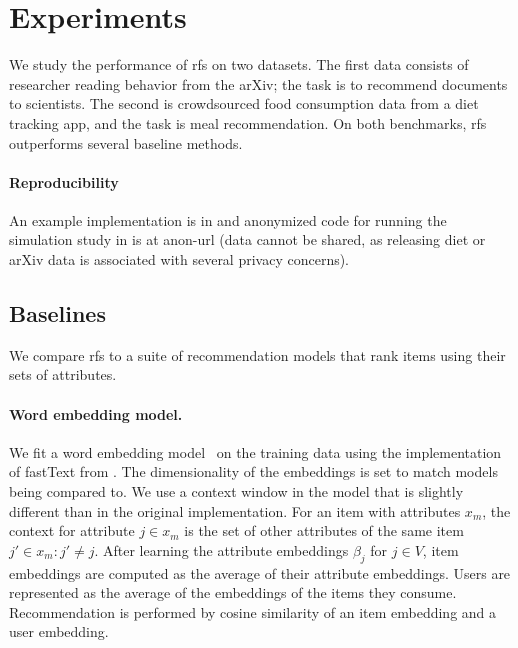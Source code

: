 \section{Experiments}
\label{sec:experiments}

We study the performance of \acrlong{rfs} on two datasets. The first data
consists of researcher reading behavior from the arXiv; the task is to recommend
documents to scientists. The second is crowdsourced food consumption data from a
diet tracking app, and the task is meal recommendation. On both benchmarks,
\gls{rfs} outperforms several baseline methods.

\paragraph{Reproducibility} An example implementation is in  and anonymized code for running
the simulation study in  is at
anon-url (data cannot be shared, as releasing diet or arXiv data is associated
with several privacy concerns).

\subsection{Baselines}
\label{subsec:experiments:baselines}
We compare \gls{rfs} to a suite of recommendation models that rank items using
their sets of attributes.

\paragraph{Word embedding model.} We fit a word embedding
model~\citep{mikolov2013distributed} on the training data using the
implementation of fastText from \citet{bojanowski2017enriching}. The
dimensionality of the embeddings is set to match models being compared to. We
use a context window in the model that is slightly different than in the
original implementation. For an item with attributes $x_m$, the context for
attribute $j\in x_m$ is the set of other attributes of the same item
${j' \in x_m: j'\neq j}$. After learning the attribute embeddings $\beta_j$
for $j \in V$, item embeddings are computed as the average of their attribute
embeddings. Users are represented as the average of the embeddings of the items
they consume. Recommendation is performed by cosine similarity of an item
embedding and a user embedding.

